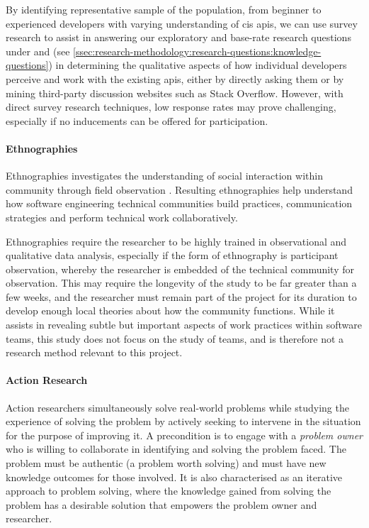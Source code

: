 By identifying representative sample of the population, from beginner to experienced developers with varying understanding of \gls{cis} \glspl{api}, we can use survey research to assist in answering our exploratory and base-rate research questions under  and  (see \cref{ssec:research-methodology:research-questions:knowledge-questions}) in determining the qualitative aspects of how individual developers perceive and work with the existing \glspl{api}, either by directly asking them or by mining third-party discussion websites such as Stack Overflow. However, with direct survey research techniques, low response rates may prove challenging, especially if no inducements can be offered for participation.

\paragraph{Ethnographies}
Ethnographies investigates the understanding of social interaction within community through field observation . Resulting ethnographies help understand how software engineering technical communities build practices, communication strategies and perform technical work collaboratively. 

Ethnographies require the researcher to be highly trained in observational and qualitative data analysis, especially if the form of ethnography is participant observation, whereby the researcher is embedded of the technical community for observation. This may require the longevity of the study to be far greater than a few weeks, and the researcher must remain part of the project for its duration to develop enough local theories about how the community functions. While it assists in revealing subtle but important aspects of work practices within software teams, this study does not focus on the study of teams, and is therefore not a research method relevant to this project.


\paragraph{Action Research}
Action researchers simultaneously solve real-world problems while studying the experience of solving the problem  by actively seeking to intervene in the situation for the purpose of improving it. A precondition is to engage with a \textit{problem owner} who is willing to collaborate in identifying and solving the problem faced. The problem must be authentic (a problem worth solving) and must have new knowledge outcomes for those involved. It is also characterised as an iterative approach to problem solving, where the knowledge gained from solving the problem has a desirable solution that empowers the problem owner and researcher. 

